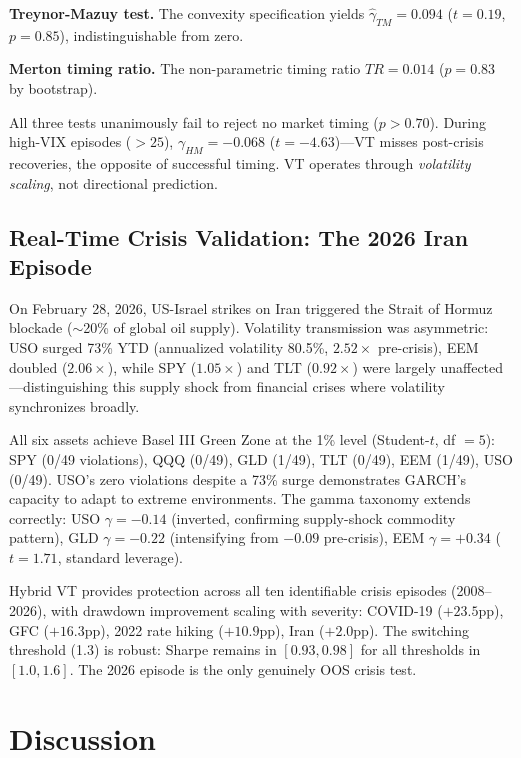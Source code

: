 \textbf{Treynor-Mazuy test.} The \citet{treynor1966} convexity specification yields $\hat{\gamma}_{TM} = 0.094$ ($t = 0.19$, $p = 0.85$), indistinguishable from zero.

\textbf{Merton timing ratio.} The non-parametric timing ratio $TR = 0.014$ ($p = 0.83$ by bootstrap).

All three tests unanimously fail to reject no market timing ($p > 0.70$). During high-VIX episodes ($>25$), $\gamma_{HM} = -0.068$ ($t = -4.63$)---VT misses post-crisis recoveries, the opposite of successful timing. VT operates through \textit{volatility scaling}, not directional prediction.

\subsection{Real-Time Crisis Validation: The 2026 Iran Episode}

On February 28, 2026, US-Israel strikes on Iran triggered the Strait of Hormuz blockade ($\sim$20\% of global oil supply). Volatility transmission was asymmetric: USO surged 73\% YTD (annualized volatility 80.5\%, $2.52\times$ pre-crisis), EEM doubled ($2.06\times$), while SPY ($1.05\times$) and TLT ($0.92\times$) were largely unaffected---distinguishing this supply shock from financial crises where volatility synchronizes broadly.

All six assets achieve Basel III Green Zone at the 1\% level (Student-$t$, df $= 5$): SPY (0/49 violations), QQQ (0/49), GLD (1/49), TLT (0/49), EEM (1/49), USO (0/49). USO's zero violations despite a 73\% surge demonstrates GARCH's capacity to adapt to extreme environments. The gamma taxonomy extends correctly: USO $\gamma = -0.14$ (inverted, confirming supply-shock commodity pattern), GLD $\gamma = -0.22$ (intensifying from $-0.09$ pre-crisis), EEM $\gamma = +0.34$ ($t = 1.71$, standard leverage).

Hybrid VT provides protection across all ten identifiable crisis episodes (2008--2026), with drawdown improvement scaling with severity: COVID-19 ($+23.5$pp), GFC ($+16.3$pp), 2022 rate hiking ($+10.9$pp), Iran ($+2.0$pp). The switching threshold (1.3) is robust: Sharpe remains in $[0.93, 0.98]$ for all thresholds in $[1.0, 1.6]$. The 2026 episode is the only genuinely OOS crisis test.



\section{Discussion}

